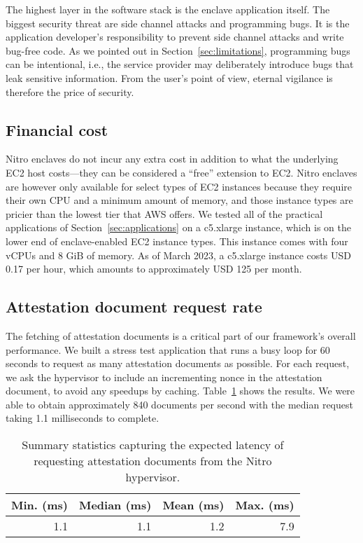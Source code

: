 The highest layer in the software stack is the enclave application itself.  The
biggest security threat are side channel attacks and programming bugs.  It is
the application developer's responsibility to prevent side channel attacks and
write bug-free code.  As we pointed out in Section~\ref{sec:limitations},
programming bugs can be intentional, i.e., the service provider may deliberately
introduce bugs that leak sensitive information.  From the user's point of view,
eternal vigilance is therefore the price of security.

\subsection{Financial cost}%
\label{sec:cost}

Nitro enclaves do not incur any extra cost in addition to what the underlying
EC2 host costs---they can be considered a ``free'' extension to EC2.  Nitro
enclaves are however only available for select types of EC2 instances because
they require their own CPU and a minimum amount of memory, and those instance
types are pricier than the lowest tier that AWS offers.  We tested all of the
practical applications of Section~\ref{sec:applications} on a c5.xlarge
instance, which is on the lower end of enclave-enabled EC2 instance types.
This instance comes with four vCPUs and 8 GiB of memory.  As of March 2023, a
c5.xlarge instance costs USD 0.17 per hour, which amounts to approximately USD
125 per month.

\subsection{Attestation document request rate}%
\label{sec:attestation-performance}

The fetching of attestation documents is a critical part of our framework's
overall performance.  We built a stress test application that runs a busy loop
for 60 seconds to request as many attestation documents as possible.  For each
request, we ask the hypervisor to include an incrementing nonce in the
attestation document, to avoid any speedups by caching.
Table~\ref{tab:att-perf} shows the results.  We were able to obtain
approximately 840 documents per second with the median request taking 1.1
milliseconds to complete.

\begin{table}[t]
    \centering
    \begin{tabular}{r r r r}
    \toprule
      Min. (ms) & Median (ms) & Mean (ms) & Max. (ms) \\
    \midrule
      1.1 & 1.1 & 1.2 & 7.9 \\
    \bottomrule
    \end{tabular}
    \caption{Summary statistics capturing the expected latency of requesting
    attestation documents from the Nitro hypervisor.}%
    \label{tab:att-perf}
\end{table}

